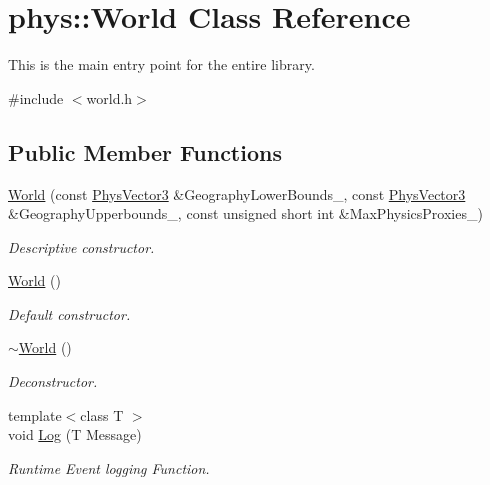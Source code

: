 \hypertarget{classphys_1_1World}{
\section{phys::World Class Reference}
\label{da/ddf/classphys_1_1World}
}


This is the main entry point for the entire library.  




{\ttfamily \#include $<$world.h$>$}

\subsection*{Public Member Functions}
\begin{DoxyCompactItemize}
\item 
\hyperlink{classphys_1_1World_a1f020a5a49a3bbfca6d570db44e72beb}{World} (const \hyperlink{classPhysVector3}{PhysVector3} \&GeographyLowerBounds\_\-, const \hyperlink{classPhysVector3}{PhysVector3} \&GeographyUpperbounds\_\-, const unsigned short int \&MaxPhysicsProxies\_)
\begin{DoxyCompactList}\small\item\em Descriptive constructor. \item\end{DoxyCompactList}\item 
\hyperlink{classphys_1_1World_a7f762724406c874250c3dc8910a1e695}{World} ()
\begin{DoxyCompactList}\small\item\em Default constructor. \item\end{DoxyCompactList}\item 
\hyperlink{classphys_1_1World_a8b2c74c7e5d5ce3c46a814e183a7aff1}{$\sim$World} ()
\begin{DoxyCompactList}\small\item\em Deconstructor. \item\end{DoxyCompactList}\item 
{\footnotesize template$<$class T $>$ }\\void \hyperlink{classphys_1_1World_a05267a20e8d5518771d0848190b33d60}{Log} (T Message)
\begin{DoxyCompactList}\small\item\em Runtime Event logging Function. \item\end{DoxyCompactList}\item 

\end{DoxyCompactItemize}
